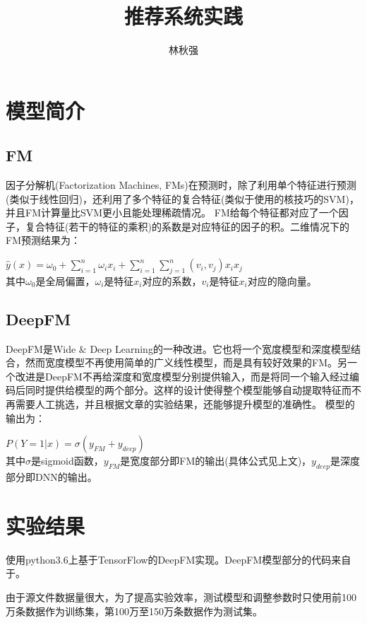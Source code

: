 \documentclass[]{article}
\title{推荐系统实践}
\author{林秋强}
\date{}
\begin{document}
\maketitle

\section{模型简介}
\subsection{FM}
因子分解机(Factorization Machines, FMs)\cite{Rendle2011}在预测时，除了利用单个特征进行预测(类似于线性回归)，还利用了多个特征的复合特征(类似于使用的核技巧的SVM)，并且FM计算量比SVM更小且能处理稀疏情况。
FM给每个特征都对应了一个因子，复合特征(若干的特征的乘积)的系数是对应特征的因子的积。二维情况下的FM预测结果为：

$\hat{y}(x)=\omega_0+\sum_{i=1}^{n}\omega_ix_i+\sum_{i=1}^{n}\sum_{j=1}^{n}(v_i,v_j)x_ix_j$
~\\
其中$\omega_0$是全局偏置，$\omega_i$是特征$x_i$对应的系数，$v_i$是特征$x_i$对应的隐向量。

\subsection{DeepFM}
DeepFM\cite{Guo2017}是Wide \& Deep Learning\cite{Cheng2016}的一种改进。它也将一个宽度模型和深度模型结合，然而宽度模型不再使用简单的广义线性模型，而是具有较好效果的FM。另一个改进是DeepFM不再给深度和宽度模型分别提供输入，而是将同一个输入经过编码后同时提供给模型的两个部分。这样的设计使得整个模型能够自动提取特征而不再需要人工挑选，并且根据文章的实验结果，还能够提升模型的准确性。
模型的输出为：

$P(Y=1|x)=\sigma(y_{FM}+y_{deep})$
~\\
其中$\sigma$是sigmoid函数，$y_{FM}$是宽度部分即FM的输出(具体公式见上文)，$y_{deep}$是深度部分即DNN的输出。

\section{实验结果}
使用python3.6上基于TensorFlow的DeepFM实现。DeepFM模型部分的代码来自于\cite{clc}。

由于源文件数据量很大，为了提高实验效率，测试模型和调整参数时只使用前100万条数据作为训练集，第100万至150万条数据作为测试集。
~\\
\end{document}
